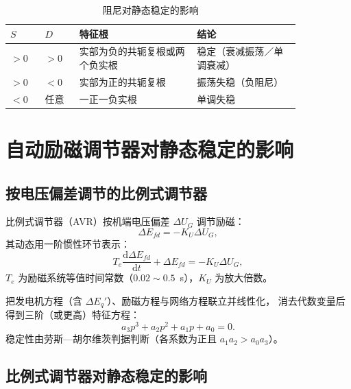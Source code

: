 \begin{table}[htbp]
  \centering
  \caption{阻尼对静态稳定的影响}
  \small
  \begin{tabular}{@{}p{0.10\linewidth}p{0.10\linewidth}p{0.34\linewidth}p{0.30\linewidth}@{}}
    \toprule
    $S$ & $D$ & 特征根 & 结论 \\
    \midrule
    $>0$ & $>0$ & 实部为负的共轭复根或两个负实根 & 稳定（衰减振荡／单调衰减） \\
    $>0$ & $<0$ & 实部为正的共轭复根 & 振荡失稳（负阻尼） \\
    $<0$ & 任意 & 一正一负实根 & 单调失稳 \\
    \bottomrule
  \end{tabular}
\end{table}


\section{自动励磁调节器对静态稳定的影响}

\subsection{按电压偏差调节的比例式调节器}

比例式调节器（AVR）按机端电压偏差 $\Delta U_G$ 调节励磁：
\begin{equation}
  \Delta E_{fd}=-K_U\Delta U_G ,
\end{equation}
其动态用一阶惯性环节表示：
\begin{equation}
  T_e\frac{\mathrm{d}\Delta E_{fd}}{\mathrm{d}t}+\Delta E_{fd}=-K_U\Delta U_G ,
\end{equation}
$T_e$ 为励磁系统等值时间常数（$0.02\sim0.5$~s），$K_U$ 为放大倍数。

把发电机方程（含 $\Delta E_q'$）、励磁方程与网络方程联立并线性化，
消去代数变量后得到三阶（或更高）特征方程：
\begin{equation}
  a_3p^{3}+a_2p^{2}+a_1p+a_0=0 .
\end{equation}
稳定性由劳斯—胡尔维茨判据判断（各系数为正且 $a_1a_2>a_0a_3$）。

\subsection{比例式调节器对静态稳定的影响}

